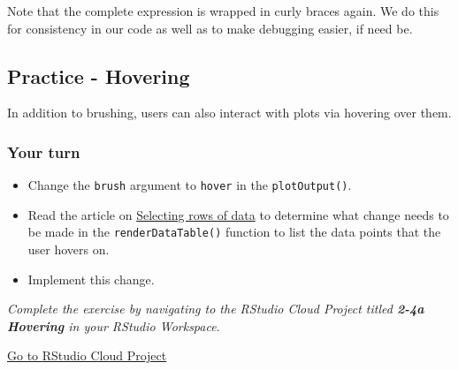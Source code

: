 \documentclass[
  letterpaper,
  DIV=11,
  numbers=noendperiod]{scrreprt}
\providecommand{\tightlist}{%
  \setlength{\itemsep}{0pt}\setlength{\parskip}{0pt}}
\begin{document}
Note that the complete expression is wrapped in curly braces again. We
do this for consistency in our code as well as to make debugging easier,
if need be.

\hypertarget{practice---hovering}{%
\subsection{Practice - Hovering}\label{practice---hovering}}

In addition to brushing, users can also interact with plots via hovering
over them.

\hypertarget{your-turn-16}{%
\subsubsection{Your turn}\label{your-turn-16}}

\begin{itemize}
\tightlist
\item
  Change the \texttt{brush} argument to \texttt{hover} in the
  \texttt{plotOutput()}.
\item
  Read the article on
  \href{http://shiny.rstudio.com/articles/selecting-rows-of-data.html}{Selecting
  rows of data} to determine what change needs to be made in the
  \texttt{renderDataTable()} function to list the data points that the
  user hovers on.
\item
  Implement this change.
\end{itemize}

\emph{Complete the exercise by navigating to the RStudio Cloud Project
titled \textbf{2-4a Hovering} in your RStudio Workspace}.

\href{https://rstudio.cloud/spaces/81721/join?access_code=I4VJaNsKfTqR3Td9hLP7E1nz8\%2FtMg6Xbw9Bgqumv}{
Go to RStudio Cloud Project}
\end{document}

